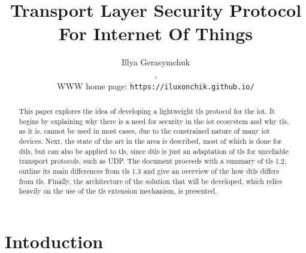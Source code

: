 \documentclass{llncs}
\begin{document}
%
\frontmatter          %
%
\pagestyle{headings}  %
%

\tableofcontents
\newpage

\mainmatter              %
%
\title{Transport Layer Security Protocol For Internet Of Things}
%
%
\author{{Illya Gerasymchuk} \\
,\\ WWW home page:
\texttt{https://iluxonchik.github.io/}}
%
%
%
\maketitle              %

\begin{abstract}
This paper explores the idea of developing a lightweight \gls{tls} protocol
for the \gls{iot}. It begins by explaining why there is a need for security in
the \gls{iot} ecosystem and why \gls{tls}, as it is, cannot be used in most cases,
due to the constrained nature of many \gls{iot} devices. Next, the state
of the art in the area is described, most of which is done for \gls{dtls}, but can
also be applied to \gls{tls}, since \gls{dtls} is just an adaptation of
\gls{tls} for unreliable transport protocols, such as UDP. The document proceeds with a
summary of \gls{tls} 1.2, outline its main differences from \gls{tls} 1.3
and give an overview of the how \gls{dtls} differs from \gls{tls}. Finally, the architecture of the solution that will be developed, which relies
heavily on the use of the \gls{tls} extension mechanism, is presented.

\end{abstract}
%
\section{Intoduction}
%
\end{document}
